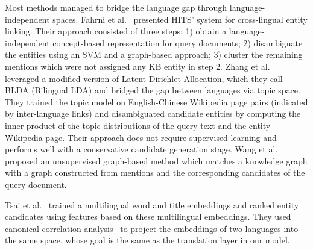 Most methods managed to bridge the language gap through language-independent spaces.
Fahrni et al.~\cite{fahrni2011hits} presented HITS' system for cross-lingual entity linking. Their approach consisted of three steps: 1) obtain a language-independent concept-based representation for query documents; 2) disambiguate the entities using an SVM and a graph-based approach; 3) cluster the remaining mentions which were not assigned any KB entity in step 2. 
Zhang et al.~\cite{zhang2011wikipedia} leveraged a modified version of Latent Dirichlet Allocation, which they call BLDA (Bilingual LDA) and bridged the gap between languages via topic space. They trained the topic model on English-Chinese Wikipedia page pairs (indicated by inter-language links) and disambiguated candidate entities by computing the inner product of the topic distributions of the query text and the entity Wikipedia page. Their approach does not require supervised learning and performs well with a conservative candidate generation stage. 
Wang et al.~\cite{wang2015language} proposed an unsupervised graph-based method which matches a knowledge graph with a graph constructed from mentions and the corresponding candidates of the query document.

Tsai et al.~\cite{tsai2016cross} trained a multilingual word and title embeddings and ranked entity candidates using features based on these multilingual embeddings. They used canonical correlation analysis~\cite{hotelling1936relations} to project the embeddings of two languages into the same space, whose goal is the same as the translation layer in our model.